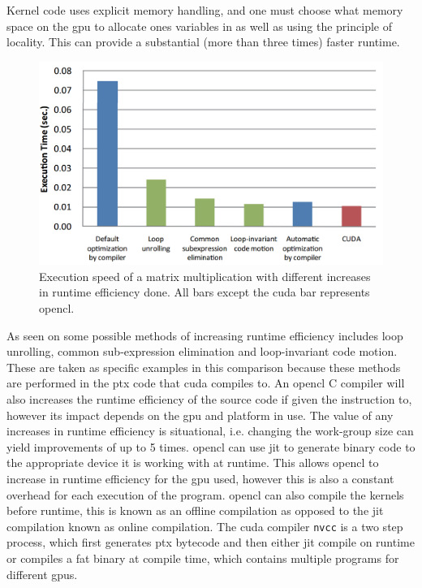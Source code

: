 Kernel code uses explicit memory handling, and one must choose what memory space on the \acrshort{gpu} to allocate ones variables in as well as using the principle of locality.
This can provide a substantial (more than three times) faster runtime. \citep{ocl_lecture3}
\begin{figure}[h]
\centering	
 \includegraphics[width=1\textwidth]{figures/opencloptimisation.png} %
\caption{Execution speed of a matrix multiplication with different increases in runtime efficiency done. All bars except the \gls{cuda} bar represents \gls{opencl}.  \citep{CUDAOpenCLOptimisation}}\label{image:OpenCLOptCompare}
\vspace{-15pt}
\end{figure}
As seen on  some possible methods of increasing runtime efficiency includes loop unrolling, common sub-expression elimination and loop-invariant code motion. 
These are taken as specific examples in this comparison because these methods are performed in the \acrfull{ptx} code that \gls{cuda} compiles to.
An \gls{opencl} C compiler will also increases the runtime efficiency of the source code if given the instruction to, however its impact depends on the \acrshort{gpu} and platform in use.
The value of any increases in runtime efficiency is situational, i.e. changing the work-group size can yield improvements of up to 5 times. \citep{ocl_lecture3}
\gls{opencl} can use \acrshort{jit} to generate binary code to the appropriate device it is working with at runtime.
This allows \gls{opencl} to increase in runtime efficiency for the \acrshort{gpu} used, however this is also a constant overhead for each execution of the program. 
\gls{opencl} can also compile the kernels before runtime, this is known as an offline compilation as opposed to the \acrshort{jit} compilation known as online compilation. 
The \gls{cuda} compiler \texttt{nvcc} is a two step process, which first generates \acrshort{ptx} bytecode and then either \acrshort{jit} compile on runtime or compiles a fat binary at compile time, which contains multiple programs for different \acrshort{gpu}s. \citep{nvidia_cude_fat_bin}

